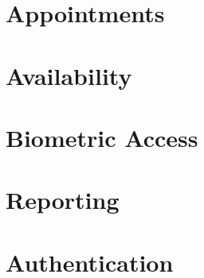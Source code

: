 \documentclass[11pt,a4paper,titlepage]{article}
\begin{document}
	\section{Appointments}
	
	
	
	\section{Availability}
	
		
	\section{Biometric Access}
	
	
	\section{Reporting}
	
	
	
	\newpage
	\section{Authentication}
	

	

	
\end{document}
